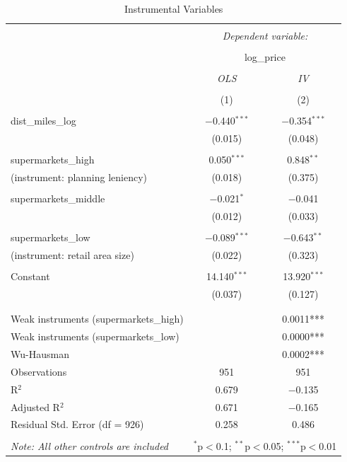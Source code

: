 \documentclass{article}
\begin{document}
\begin{table}[!htbp] \centering 
  \caption{Instrumental Variables} 
  \label{} 
\begin{tabular}{@{\extracolsep{5pt}}lcc} 
\\[-1.8ex]\hline 
\hline \\[-1.8ex] 
 & \multicolumn{2}{c}{\textit{Dependent variable:}} \\ 
\cline{2-3} 
\\[-1.8ex] & \multicolumn{2}{c}{log\_price} \\ 
\\[-1.8ex] & \textit{OLS} & \textit{IV} \\ 
\\[-1.8ex] & (1) & (2)\\ 
\hline \\[-1.8ex] 
 dist\_miles\_log & $-$0.440$^{***}$ & $-$0.354$^{***}$ \\ 
  & (0.015) & (0.048) \\ 
  & & \\ 
 supermarkets\_high & 0.050$^{***}$ & 0.848$^{**}$ \\ 
  (instrument: planning leniency) & (0.018) & (0.375) \\ 
  & & \\ 
 supermarkets\_middle & $-$0.021$^{*}$ & $-$0.041 \\ 
   & (0.012) & (0.033) \\ 
  & & \\ 
 supermarkets\_low & $-$0.089$^{***}$ & $-$0.643$^{**}$ \\ 
  (instrument: retail area size) & (0.022) & (0.323) \\ 
  & & \\ 
 Constant & 14.140$^{***}$ & 13.920$^{***}$ \\ 
  & (0.037) & (0.127) \\ 
  & & \\ 
\hline \\[-1.8ex] 
Weak instruments (supermarkets\_high) &  & 0.0011*** \\ 
Weak instruments (supermarkets\_low) &  & 0.0000*** \\ 
Wu-Hausman &  & 0.0002*** \\ 
Observations & 951 & 951 \\ 
R$^{2}$ & 0.679 & $-$0.135 \\ 
Adjusted R$^{2}$ & 0.671 & $-$0.165 \\ 
Residual Std. Error (df = 926) & 0.258 & 0.486 \\ 
\hline 
\hline \\[-1.8ex] 
\textit{Note: All other controls are included}  & \multicolumn{2}{r}{$^{*}$p$<$0.1; $^{**}$p$<$0.05; $^{***}$p$<$0.01} \\ 
\end{tabular} 
\end{table} 
\end{document}
